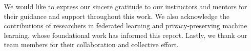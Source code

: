 
\begin{acknowledgements}
We would like to express our sincere gratitude to our instructors and mentors for their guidance and support throughout this work. We also acknowledge the contributions of researchers in federated learning and privacy-preserving machine learning, whose foundational work has informed this report. Lastly, we thank our team members for their collaboration and collective effort.
\end{acknowledgements}
